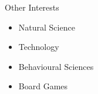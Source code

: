 %

\begin{rSection}{Other Interests}
    \begin{itemize}
        \item Natural Science
        \item Technology
        \item Behavioural Sciences
        \item Board Games
    \end{itemize}
\end{rSection}
